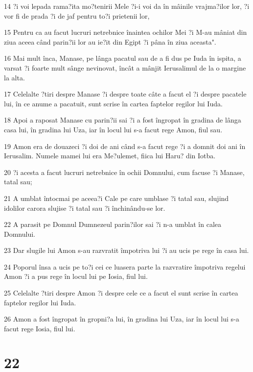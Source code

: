\par 14 ?i voi lepada rama?ita mo?tenirii Mele ?i-i voi da în mâinile vrajma?ilor lor, ?i vor fi de prada ?i de jaf pentru to?i prietenii lor,
\par 15 Pentru ca au facut lucruri netrebnice înaintea ochilor Mei ?i M-au mâniat din ziua aceea când parin?ii lor au ie?it din Egipt ?i pâna în ziua aceasta".
\par 16 Mai mult înca, Manase, pe lânga pacatul sau de a fi dus pe Iuda în ispita, a varsat ?i foarte mult sânge nevinovat, încât a mânjit Ierusalimul de la o margine la alta.
\par 17 Celelalte ?tiri despre Manase ?i despre toate câte a facut el ?i despre pacatele lui, în ce anume a pacatuit, sunt scrise în cartea faptelor regilor lui Iuda.
\par 18 Apoi a raposat Manase cu parin?ii sai ?i a fost îngropat în gradina de lânga casa lui, în gradina lui Uza, iar în locul lui s-a facut rege Amon, fiul sau.
\par 19 Amon era de douazeci ?i doi de ani când s-a facut rege ?i a domnit doi ani în Ierusalim. Numele mamei lui era Me?ulemet, fiica lui Haru? din Iotba.
\par 20 ?i acesta a facut lucruri netrebnice în ochii Domnului, cum facuse ?i Manase, tatal sau;
\par 21 A umblat întocmai pe aceea?i Cale pe care umblase ?i tatal sau, slujind idolilor carora slujise ?i tatal sau ?i închinându-se lor.
\par 22 A parasit pe Domnul Dumnezeul parin?ilor sai ?i n-a umblat în calea Domnului.
\par 23 Dar slugile lui Amon s-au razvratit împotriva lui ?i au ucis pe rege în casa lui.
\par 24 Poporul însa a ucis pe to?i cei ce luasera parte la razvratire împotriva regelui Amon ?i a pus rege în locul lui pe Iosia, fiul lui.
\par 25 Celelalte ?tiri despre Amon ?i despre cele ce a facut el sunt scrise în cartea faptelor regilor lui Iuda.
\par 26 Amon a fost îngropat în gropni?a lui, în gradina lui Uza, iar în locul lui s-a facut rege Iosia, fiul lui.

\chapter{22}

